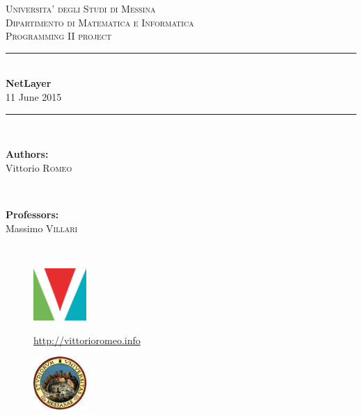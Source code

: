 \documentclass[11pt]{report}
\newcommand{\+}{\discretionary{\mbox{\scriptsize$\hookleftarrow$}}{}{}}
\newcommand{\HRule}{\rule{\linewidth}{0.5mm}}
\renewcommand\emph{\textbf}
\begin{document}
\begin{titlepage}

    \center

    \textsc{\LARGE Universita' degli Studi di Messina}\\[0.1cm]
    \textsc{\Large Dipartimento di Matematica e Informatica}\\[0.5cm]
    \textsc{\Large Programming II project}\\[0.5cm]

    \HRule \\[0.4cm]
    { \huge \bfseries NetLayer}\\[0.1cm]

    {\large 11 June 2015}
    \HRule \\[1.5cm]

    \begin{minipage}{0.4\textwidth}
    \begin{flushleft} \large
    \emph{Authors:}\\
    Vittorio \textsc{Romeo}
    \end{flushleft}
    \end{minipage}
    ~
    \begin{minipage}{0.4\textwidth}
    \begin{flushright} \large
    \emph{Professors:} \\
    Massimo \textsc{Villari}


    \end{flushright}
    \end{minipage}\\[4cm]

    \vfill


    \begin{minipage}{\linewidth}
        \centering
        \begin{minipage}{0.35\linewidth}
            \begin{figure}[H]
                \center
                \includegraphics[width=2cm, height=2cm]{logovee}

                \url{http://vittorioromeo.info}
            \end{figure}
        \end{minipage}
        \hspace{0.27\linewidth}
        \begin{minipage}{0.35\linewidth}
            \begin{figure}[H]
                \center
                \includegraphics[width=2cm, height=2cm]{logounime}


\end{figure}
\end{minipage}
\end{minipage}
\end{titlepage}
\end{document}

